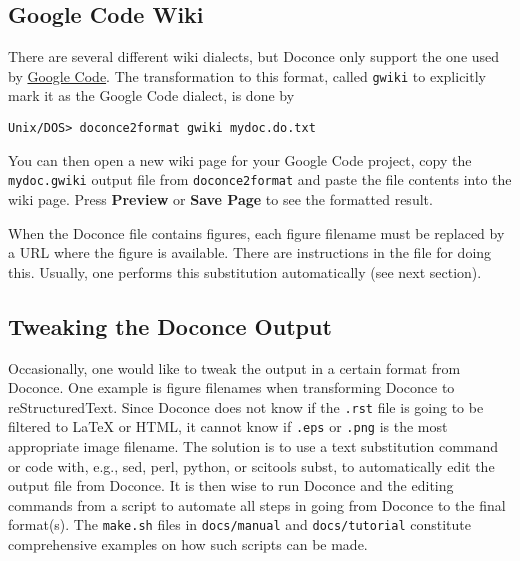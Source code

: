 \documentclass{article}
\begin{document}
\subsection{Google Code Wiki}

There are several different wiki dialects, but Doconce only support the
one used by \href{http://code.google.com/p/support/wiki/WikiSyntax}{Google Code}.
The transformation to this format, called {\fontsize{10pt}{10pt}\verb!gwiki!} to explicitly mark
it as the Google Code dialect, is done by
\vspace{4pt}
\begin{Verbatim}[numbers=none,frame=lines,label=\fbox{{\tiny Terminal}},fontsize=\fontsize{9pt}{9pt},
labelposition=topline,framesep=2.5mm,framerule=0.7pt]
Unix/DOS> doconce2format gwiki mydoc.do.txt
\end{Verbatim}
You can then open a new wiki page for your Google Code project, copy
the {\fontsize{10pt}{10pt}\verb!mydoc.gwiki!} output file from {\fontsize{10pt}{10pt}\verb!doconce2format!} and paste the
file contents into the wiki page. Press \textbf{Preview} or \textbf{Save Page} to
see the formatted result.

When the Doconce file contains figures, each figure filename must be
replaced by a URL where the figure is available. There are instructions
in the file for doing this. Usually, one performs this substitution
automatically (see next section).

\subsection{Tweaking the Doconce Output}

Occasionally, one would like to tweak the output in a certain format
from Doconce. One example is figure filenames when transforming
Doconce to reStructuredText. Since Doconce does not know if the
{\fontsize{10pt}{10pt}\verb!.rst!} file is going to be filtered to {\LaTeX} or HTML, it cannot know
if {\fontsize{10pt}{10pt}\verb!.eps!} or {\fontsize{10pt}{10pt}\verb!.png!} is the most appropriate image filename.
The solution is to use a text substitution command or code with, e.g., sed,
perl, python, or scitools subst, to automatically edit the output file
from Doconce. It is then wise to run Doconce and the editing commands
from a script to automate all steps in going from Doconce to the final
format(s). The {\fontsize{10pt}{10pt}\verb!make.sh!} files in {\fontsize{10pt}{10pt}\verb!docs/manual!} and {\fontsize{10pt}{10pt}\verb!docs/tutorial!} 
constitute comprehensive examples on how such scripts can be made.
\end{document}
